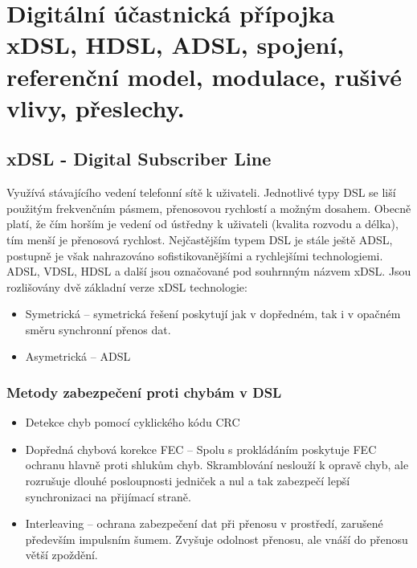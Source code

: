 \newpage
\section{Digitální účastnická přípojka xDSL, HDSL, ADSL, spojení, referenční model, modulace, rušivé vlivy, přeslechy.}
\subsection{xDSL - Digital Subscriber Line}
Využívá stávajícího vedení telefonní sítě k uživateli. Jednotlivé typy DSL se liší použitým frekvenčním pásmem, přenosovou
rychlostí a možným dosahem. Obecně platí, že čím horším je vedení od ústředny k uživateli (kvalita
rozvodu a délka), tím menší je přenosová rychlost. Nejčastějším typem DSL je stále ještě ADSL, postupně je však nahrazováno
sofistikovanějšími a rychlejšími technologiemi. ADSL, VDSL, HDSL a další jsou označované pod souhrnným názvem xDSL. Jsou rozlišovány dvě základní verze xDSL technologie:
\begin{itemize}
    \item Symetrická -- symetrická řešení poskytují jak v dopředném, tak i v opačném směru synchronní přenos dat.
    \item Asymetrická -- ADSL
\end{itemize}

\subsubsection{Metody zabezpečení proti chybám v DSL}
\begin{itemize}
    \item Detekce chyb pomocí cyklického kódu CRC
    \item Dopředná chybová korekce FEC -- Spolu s prokládáním poskytuje FEC ochranu hlavně proti shlukům chyb. Skramblování neslouží k opravě chyb, ale rozrušuje dlouhé posloupnosti jedniček a nul a tak zabezpečí lepší synchronizaci na přijímací straně.
    \item Interleaving -- ochrana zabezpečení dat při přenosu v prostředí, zarušené především impulsním šumem. Zvyšuje odolnost přenosu, ale vnáší do přenosu větší zpoždění.
\end{itemize}

